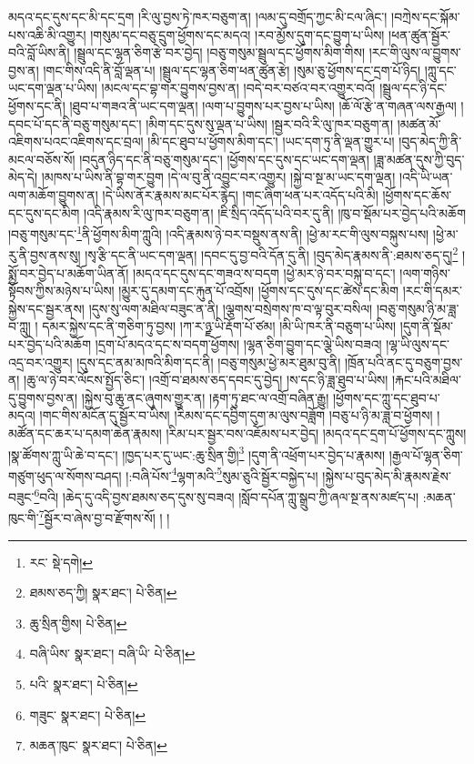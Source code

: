 མདའ་དང་དུས་དང་མི་དང་དྲག །རི་ལུ་བྱས་ཏེ་ཁར་བཅུག་ན། །ལམ་དུ་བགྲོད་ཀྱང་མི་ངལ་ཞིང་། །བཀྲེས་དང་སྐོམ་པས་འཆི་མི་འགྱུར། །གསུམ་དང་བཅུ་དྲུག་ཕྱོགས་དང་མདའ། །རབ་མྱོས་དུག་དང་བྱུག་པ་ཡིས། །ཕན་ཚུན་སྦྱོར་བའི་བློ་ཡིས་ནི། །སྦྲུལ་དང་ལྷན་ཅིག་རྩེ་བར་བྱེད། །བཅུ་གསུམ་སྦྲུལ་དང་ཕྱོགས་མིག་གིས། །རང་གི་ལུས་ལ་བྱུགས་བྱས་ན། །གང་གིས་འདི་ནི་བློ་ལྡན་པ། །སྦྲུལ་དང་ལྷན་ཅིག་ཕན་ཚུན་རྩེ། །སུམ་ཅུ་ཕྱོགས་དང་དྲག་པོ་ཉིད། །ཀླུ་དང་ཡང་དག་ལྡན་པ་ཡིས། །མངལ་དང་བྷ་གར་བྱུགས་བྱས་ན། །བདེ་བར་བཙའ་བར་འགྱུར་བའོ། །སྦྲུལ་དང་ཉི་དང་ཕྱོགས་དང་ནི། །ཐུབ་པ་གཟའ་ནི་ཡང་དག་ལྡན། །ལག་པ་བྱུགས་པར་བྱས་པ་ཡིས། །ཆོ་ལོ་རྩེ་ན་གཞན་ལས་རྒྱལ། །དབང་པོ་དང་ནི་བཅུ་གསུམ་དང་། །མིག་དང་དུས་སུ་ལྡན་པ་ཡིས། །སྦྱར་བའི་རི་ལུ་ཁར་བཅུག་ན། །མཚན་མོ་འཇིགས་པའང་འཇིགས་དང་བྲལ། །མི་དང་ཐུབ་པ་ཕྱོགས་མིག་དང་། །ཡང་དག་ཏུ་ནི་ལྡན་གྱུར་པ། །བུད་མེད་ཀྱི་ནི་མངལ་བཅོས་སོ། །བདུན་ཉིད་དང་ནི་བཅུ་གསུམ་དང་། །ཕྱོགས་དང་དུས་དང་ཡང་དག་ལྡན། །ཟླ་མཚན་དུས་ཀྱི་བུད་མེད་དེ། །མཁས་པ་ཡིས་ནི་བྷ་གར་བྱུག །དེ་ལ་བུ་ནི་འབྱུང་བར་འགྱུར། །སྐྱེ་བ་སྔ་མ་ཡང་དག་ལྡན། །འདི་ཡི་ཡན་ལག་མཆོག་བྱུགས་ན། །དེ་ཡིས་ནོར་རྣམས་མང་པོར་རྙེད། །གང་ཞིག་ཕན་པར་འདོད་པའི་མི། །ཕྱོགས་དང་ཆོས་དང་དུས་དང་མིག །འདི་རྣམས་རི་ལུ་ཁར་བཅུག་ན། །ཇི་སྲིད་འདོད་པའི་བར་དུ་ནི། །ཁུ་བ་སྡོམ་པར་བྱེད་པའི་མཆོག །བཅུ་གསུམ་དང་\footnote{རང་  སྡེ་དགེ། }ནི་ཕྱོགས་མིག་ཀླུའི། །འདི་རྣམས་ཉེ་བར་བསྡུས་ནས་ནི། །ཕྱེ་མ་རང་གི་ལུས་བསྐུས་པས། །ཕྱེ་མ་རུ་ནི་བྱས་ནས་སུ། །སྭ་རྩི་དང་ནི་ཡང་དག་ལྡན། །དབང་དུ་བྱ་བའི་དོན་དུ་ནི། །བུད་མེད་རྣམས་ནི་:ཐམས་ཅད་དུ།\footnote{ཐམས་ཅད་ཀྱི།  སྣར་ཐང་།  པེ་ཅིན། } །སྨྱོ་བར་བྱེད་པ་མཆོག་ཡིན་ནོ། །མདའ་དང་དུས་དང་གཟའ་ས་བདག །ཕྱེ་མར་ཉེ་བར་བསྐུ་བ་དང་། །ལག་གཉིས་སྟོབས་ཀྱིས་མཉེས་པ་ཡིས། །མྱུར་དུ་དམག་དང་རྐུན་པོ་འབྲོས། །ཕྱོགས་དང་དུས་དང་ཚེས་དང་མིག །རང་གི་དམར་སྐྱེས་དང་སྦྱར་ནས། །དུས་སུ་ལག་མཐིལ་བཟུང་ན་ནི། །ལྕགས་བསྲེགས་ཁ་བ་ལྟ་བུར་བསིལ། །བཅུ་གསུམ་ཉི་མ་ཟླ་བ་ཀླུ། །
དམར་སྐྱེས་དང་ནི་གཅིག་ཏུ་བྱས། །ཀ་ར་ཉྫ་ཡི་རྡོག་པོ་ཙམ། །མི་ཡི་ཁར་ནི་བཅུག་པ་ཡིས། །དུག་ནི་སྡོམ་པར་བྱེད་པའི་མཆོག །དྲག་པོ་མདའ་དང་ས་བདག་ཕྱོགས། །ལྷན་ཅིག་བྱུག་དང་ལྕེ་ཡིས་བཟའ། །ལྷ་ཡི་ལུས་དང་འདྲ་བར་འགྱུར། །དུས་དང་ནམ་མཁའི་མིག་དང་ནི། །བཅུ་གསུམ་ཕྱེ་མར་ཐུམ་བུ་ནི། །ཁྲོན་པའི་ནང་དུ་བཅུག་བྱས་ན། །ཆུ་ལ་ཉེ་བར་ལོངས་སྤྱོད་ཅིང་། །འགྲོ་བ་ཐམས་ཅད་དབང་དུ་བྱེད། །ས་དང་ཉི་ཟླ་ཐུབ་པ་ཡིས། །རྐང་པའི་མཐིལ་དུ་བྱུགས་བྱས་ན། །སྐྱེས་བུ་ཆུ་ནང་ཞུགས་གྱུར་ན། །རྟག་ཏུ་ཐང་ལ་འགྲོ་བཞིན་རྒྱུ། །ཕྱོགས་དང་ཀླུ་དང་ཐུབ་པ་མདའ། །གང་གིས་མངོན་དུ་སྦྱོར་བ་ཡིས། །རིམས་དང་དབྱིག་དུག་མ་ལུས་བཟློག །བཅུ་པ་ཉི་མ་ཟླ་བ་ཕྱོགས། །མཚོན་དང་ཆར་པ་དམག་ཆེན་རྣམས། །རིམ་པར་སྦྱར་བས་འཇོམས་པར་བྱེད། །མདའ་དང་དྲག་པོ་ཕྱོགས་དང་ཀླུས། །སྣ་ཚོགས་ཀླུ་ཡི་ཆེ་བ་དང་། །ཁྱད་པར་དུ་ཡང་:ཆུ་སྲིན་གྱི།\footnote{ཆུ་སྲིན་གྱིས།  པེ་ཅིན། } །དུག་ནི་འཕྲོག་པར་བྱེད་པ་རྣམས། །རྒྱལ་པོ་ལྷན་ཅིག་གཙུག་ཕུད་ལ་སོགས་བཤད། །:བཞི་པོས་\footnote{བཞི་ཡིས་  སྣར་ཐང་། བཞི་ཡི་  པེ་ཅིན། }ལྷག་མའི་\footnote{པའི་  སྣར་ཐང་།  པེ་ཅིན། }སུམ་ཅུའི་སྦྱོར་བསྐྱེད་པ། །སྐྱེས་པ་བུད་མེད་མི་རྣམས་རྗེས་བཟུང་\footnote{གཟུང་  སྣར་ཐང་།  པེ་ཅིན། }བའི། །ཆེད་དུ་འདི་བྱས་ཐམས་ཅད་དུས་སུ་བཟའ། །སློབ་དཔོན་ཀླུ་སྒྲུབ་ཀྱི་ཞལ་སྔ་ནས་མཛད་པ། :མཆན་ཁུང་གི་\footnote{མཆན་ཁུང་  སྣར་ཐང་།  པེ་ཅིན། }སྦྱོར་བ་ཞེས་བྱ་བ་རྫོགས་སོ། ། །